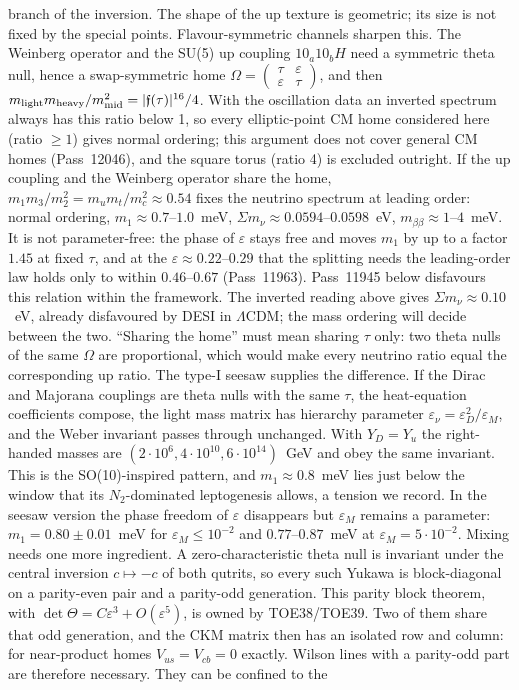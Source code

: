branch of the inversion. The shape of the up texture is geometric; its size is not fixed by the special points.  Flavour-symmetric channels sharpen this. The Weinberg operator and the SU(5) up coupling $10_a10_bH$ need a symmetric theta null, hence a swap-symmetric home $\Omega=(\begin{smallmatrix}\tau&\varepsilon\\\varepsilon&\tau\end{smallmatrix})$, and then $m_{\rm light}m_{\rm heavy}/m_{\rm mid}^2=|\mathfrak f(\tau)|^{16}/4$. With the oscillation data an inverted spectrum always has this ratio below 1, so every elliptic-point CM home considered here (ratio $\ge1$) gives normal ordering; this argument does not cover general CM homes (Pass~12046), and the square torus (ratio 4) is excluded outright. If the up coupling and the Weinberg operator share the home, $m_1m_3/m_2^2=m_um_t/m_c^2\approx0.54$ fixes the neutrino spectrum at leading order: normal ordering, $m_1\approx0.7$--$1.0$~meV, $\Sigma m_\nu\approx0.0594$--$0.0598$~eV, $m_{\beta\beta}\approx1$--$4$~meV. It is not parameter-free: the phase of $\varepsilon$ stays free and moves $m_1$ by up to a factor $1.45$ at fixed $\tau$, and at the $\varepsilon\approx0.22$--$0.29$ that the splitting needs the leading-order law holds only to within $0.46$--$0.67$ (Pass~11963). Pass~11945 below disfavours this relation within the framework. The inverted reading above gives $\Sigma m_\nu\approx0.10$~eV, already disfavoured by DESI in $\Lambda$CDM; the mass ordering will decide between the two.  ``Sharing the home'' must mean sharing $\tau$ only: two theta nulls of the same $\Omega$ are proportional, which would make every neutrino ratio equal the corresponding up ratio. The type-I seesaw supplies the difference. If the Dirac and Majorana couplings are theta nulls with the same $\tau$, the heat-equation coefficients compose, the light mass matrix has hierarchy parameter $\varepsilon_\nu=\varepsilon_D^2/\varepsilon_M$, and the Weber invariant passes through unchanged. With $Y_D=Y_u$ the right-handed masses are $(2\cdot10^6,4\cdot10^{10},6\cdot10^{14})$~GeV and obey the same invariant. This is the SO(10)-inspired pattern, and $m_1\approx0.8$~meV lies just below the window that its $N_2$-dominated leptogenesis allows, a tension we record. In the seesaw version the phase freedom of $\varepsilon$ disappears but $\varepsilon_M$ remains a parameter: $m_1=0.80\pm0.01$~meV for $\varepsilon_M\le10^{-2}$ and $0.77$--$0.87$~meV at $\varepsilon_M=5\cdot10^{-2}$.  Mixing needs one more ingredient. A zero-characteristic theta null is invariant under the central inversion $c\mapsto-c$ of both qutrits, so every such Yukawa is block-diagonal on a parity-even pair and a parity-odd generation. This parity block theorem, with $\det\Theta=C\varepsilon^3+O(\varepsilon^5)$, is owned by TOE38/TOE39.  Two of them share that odd generation, and the CKM matrix then has an isolated row and column: for near-product homes $V_{us}=V_{cb}=0$ exactly. Wilson lines with a parity-odd part are therefore necessary. They can be confined to the 